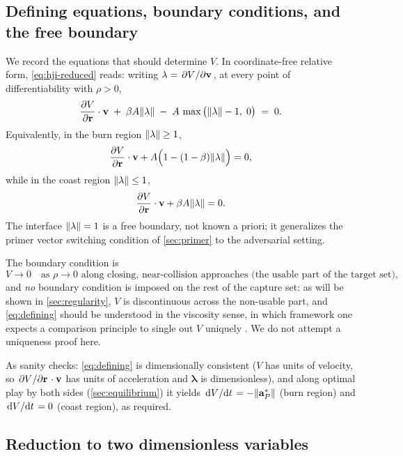 \documentclass{article}
\renewcommand{\vec}[1]{\mathbf{#1}}
\theoremstyle{remark}
\begin{document}
\subsection{Defining equations, boundary conditions, and the free boundary}
\label{sec:defining}

We record the equations that should determine $V$.  In coordinate-free
relative form, \cref{eq:hji-reduced} reads: writing
$\vec\lambda = \pdv*{V}{\vec v}$, at every point of differentiability with
$\rho > 0$,
\begin{equation}
  \label{eq:defining}
  \pdv{V}{\vec r} \cdot \vec v
  \;+\; \beta A \norm{\vec \lambda}
  \;-\; A \, \max\big( \norm{\vec\lambda} - 1, \; 0 \big)
  \;=\; 0 .
\end{equation}
Equivalently, in the burn region $\norm{\vec\lambda} \ge 1$,
\[
  \pdv{V}{\vec r} \cdot \vec v + A\Big( 1 - (1 - \beta) \norm{\vec\lambda}
  \Big) = 0,
\]
while in the coast region $\norm{\vec\lambda} \le 1$,
\[
  \pdv{V}{\vec r} \cdot \vec v + \beta A \norm{\vec\lambda} = 0 .
\]
The interface $\norm{\vec\lambda} = 1$ is a free boundary, not known a
priori; it generalizes the primer vector switching condition of
\cref{sec:primer} to the adversarial setting.

The boundary condition is
\begin{equation}
  \label{eq:bc}
  V \to 0 \quad \text{as } \rho \to 0 \text{ along closing, near-collision
    approaches (the usable part of the target set)},
\end{equation}
and \emph{no} boundary condition is imposed on the rest of the capture set: as
will be shown in \cref{sec:regularity}, $V$ is discontinuous across the
non-usable part, and \cref{eq:defining} should be understood in the viscosity
sense, in which framework one expects a comparison principle to single out
$V$ uniquely \cite{crandalllions1983,bardi1997}.  We do not attempt a
uniqueness proof here.

As sanity checks: \cref{eq:defining} is dimensionally consistent ($V$ has
units of velocity, so $\pdv*{V}{\vec r}\cdot\vec v$ has units of acceleration
and $\vec\lambda$ is dimensionless), and along optimal play by both sides
(\cref{sec:equilibrium}) it yields $\dv*{V}{t} = -\norm{\vec a_P^*}$ (burn
region) and $\dv*{V}{t} = 0$ (coast region), as required.

\subsection{Reduction to two dimensionless variables}
\end{document}
